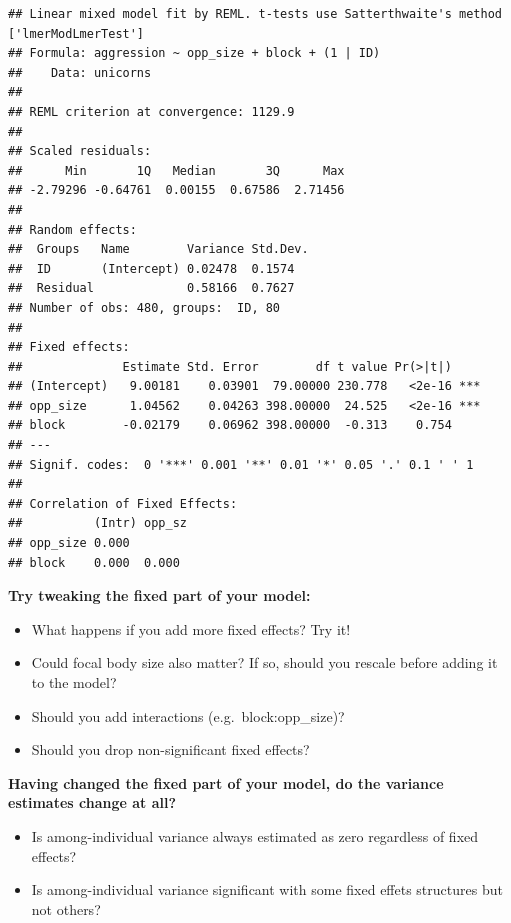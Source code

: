 \documentclass[
  12pt,
]{book}
\makeatletter
\providecommand{\tightlist}{%
  \setlength{\itemsep}{0pt}\setlength{\parskip}{0pt}}
\newenvironment{kframe}{%
\medskip{}
\setlength{\fboxsep}{.8em}
\def\at@end@of@kframe{}%
\ifinner\ifhmode%
 \def\at@end@of@kframe{\end{minipage}}%
 \begin{minipage}{\columnwidth}%
\fi\fi%
\def\FrameCommand##1{\hskip\@totalleftmargin \hskip-\fboxsep
\colorbox{incolor}{##1}\hskip-\fboxsep
    \hskip-\linewidth \hskip-\@totalleftmargin \hskip\columnwidth}%
\MakeFramed {\advance\hsize-\width
  \@totalleftmargin\z@ \linewidth\hsize
  \@setminipage}}%
{\par\unskip\endMakeFramed%
\at@end@of@kframe}
\newenvironment{rmdblock}[1]
 {
 \begin{itemize}
 \renewcommand{\labelitemi}{
   \raisebox{-.7\height}[0pt][0pt]{
     {\setkeys{Gin}{width=3em,keepaspectratio}\texttt{[image: images/icons/\#1]}}
   }
 }
 \begin{kframe}
 \setlength{\fboxsep}{1em}
 \item
 }
 {
 \end{kframe}
 \end{itemize}
 }
\newenvironment{rmdcode}
  {\begin{rmdblock}{code}}
  {\end{rmdblock}}
\makeatother
\begin{document}
\begin{verbatim}
## Linear mixed model fit by REML. t-tests use Satterthwaite's method ['lmerModLmerTest']
## Formula: aggression ~ opp_size + block + (1 | ID)
##    Data: unicorns
## 
## REML criterion at convergence: 1129.9
## 
## Scaled residuals: 
##      Min       1Q   Median       3Q      Max 
## -2.79296 -0.64761  0.00155  0.67586  2.71456 
## 
## Random effects:
##  Groups   Name        Variance Std.Dev.
##  ID       (Intercept) 0.02478  0.1574  
##  Residual             0.58166  0.7627  
## Number of obs: 480, groups:  ID, 80
## 
## Fixed effects:
##              Estimate Std. Error        df t value Pr(>|t|)    
## (Intercept)   9.00181    0.03901  79.00000 230.778   <2e-16 ***
## opp_size      1.04562    0.04263 398.00000  24.525   <2e-16 ***
## block        -0.02179    0.06962 398.00000  -0.313    0.754    
## ---
## Signif. codes:  0 '***' 0.001 '**' 0.01 '*' 0.05 '.' 0.1 ' ' 1
## 
## Correlation of Fixed Effects:
##          (Intr) opp_sz
## opp_size 0.000        
## block    0.000  0.000
\end{verbatim}

\begin{rmdcode}
\textbf{Try tweaking the fixed part of your model:}

\begin{itemize}
\tightlist
\item
  What happens if you add more fixed effects? Try it!
\item
  Could focal body size also matter? If so, should you rescale before adding it to the model?
\item
  Should you add interactions (e.g.~block:opp\_size)?
\item
  Should you drop non-significant fixed effects?
\end{itemize}
\end{rmdcode}

\begin{rmdcode}
\textbf{Having changed the fixed part of your model, do the variance estimates change at all?}

\begin{itemize}
\tightlist
\item
  Is among-individual variance always estimated as zero regardless of fixed effects?
\item
  Is among-individual variance significant with some fixed effets structures but not others?
\end{itemize}
\end{rmdcode}
\end{document}
